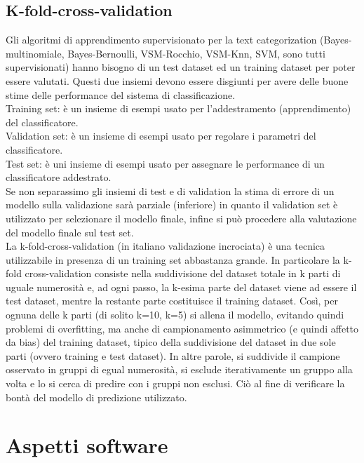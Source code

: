 \documentclass{article}
\theoremstyle{plain}
\theoremstyle{definition}
\begin{document}
\subsection{K-fold-cross-validation}
Gli algoritmi di apprendimento supervisionato per la text categorization (Bayes-multinomiale, Bayes-Bernoulli, VSM-Rocchio, VSM-Knn, SVM, sono tutti supervisionati) hanno bisogno di un test dataset ed un training dataset per poter essere valutati. Questi due insiemi devono essere disgiunti per avere delle buone stime delle performance del sistema di classificazione.
\\
Training set: è un insieme di esempi usato per l'addestramento (apprendimento) del classificatore.
\\
Validation set: è un insieme di esempi usato per regolare i parametri del classificatore.
\\
Test set: è uni insieme di esempi usato per assegnare le performance di un classificatore addestrato.
\\
Se non separassimo gli insiemi di test e di validation la stima di errore di un modello sulla validazione sarà parziale (inferiore) in quanto il validation set è utilizzato per selezionare il modello finale, infine si può procedere alla valutazione del modello finale sul test set.
\\
La k-fold-cross-validation (in italiano validazione incrociata) è una tecnica utilizzabile in presenza di un training set abbastanza grande. In particolare la k-fold cross-validation consiste nella suddivisione del dataset totale in k parti di uguale numerosità e, ad ogni passo, la k-esima parte del dataset viene ad essere il test dataset, mentre la restante parte costituisce il training dataset. Così, per ognuna delle k parti (di solito k=10, k=5) si allena il modello, evitando quindi problemi di overfitting, ma anche di campionamento asimmetrico (e quindi affetto da bias) del training dataset, tipico della suddivisione del dataset in due sole parti (ovvero training e test dataset). In altre parole, si suddivide il campione osservato in gruppi di egual numerosità, si esclude iterativamente un gruppo alla volta e lo si cerca di predire con i gruppi non esclusi. Ciò al fine di verificare la bontà del modello di predizione utilizzato.

\newpage
\section{Aspetti software}
\end{document}
